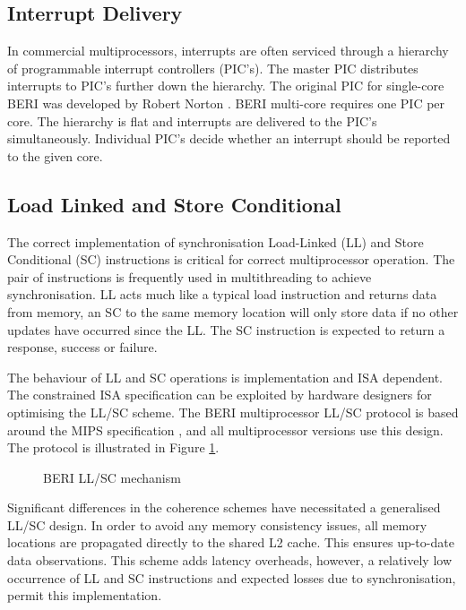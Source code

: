 	\subsection{Interrupt Delivery}
		In commercial multiprocessors, interrupts are often serviced through a hierarchy of programmable interrupt controllers (PIC's). The master PIC distributes interrupts to PIC's further down the hierarchy. The original PIC for single-core BERI was developed by Robert Norton \cite{Norton15}. BERI multi-core requires one PIC per core. The hierarchy is flat and interrupts are delivered to the PIC's simultaneously. Individual PIC's decide whether an interrupt should be reported to the given core.

	\subsection{Load Linked and Store Conditional}
		The correct implementation of synchronisation Load-Linked (LL) and Store Conditional (SC) instructions is critical for correct multiprocessor operation.
		The pair of instructions is frequently used in multithreading to achieve synchronisation. LL acts much like a typical load instruction and returns data from memory, an SC to the same memory location will only store data if no other updates have occurred since the LL. The SC instruction is expected to return a response, success or failure. 
		
		The behaviour of LL and SC operations is implementation and ISA dependent. The constrained ISA specification can be exploited by hardware designers for optimising the LL/SC scheme. The BERI multiprocessor LL/SC protocol is based around the MIPS specification \cite{MIPS}, and all multiprocessor versions use this design. The protocol is illustrated in Figure \ref{beri_llsc}.
		
		\begin{figure}[!t]
			\centering 
				\caption{BERI LL/SC mechanism} 
				\label{beri_llsc}
		\end{figure}

		Significant differences in the coherence schemes have necessitated a generalised LL/SC design. In order to avoid any memory consistency issues, all memory locations are propagated directly to the shared L2 cache. This ensures up-to-date data observations. This scheme adds latency overheads, however, a relatively low occurrence of LL and SC instructions and expected losses due to synchronisation, permit this implementation.
		
